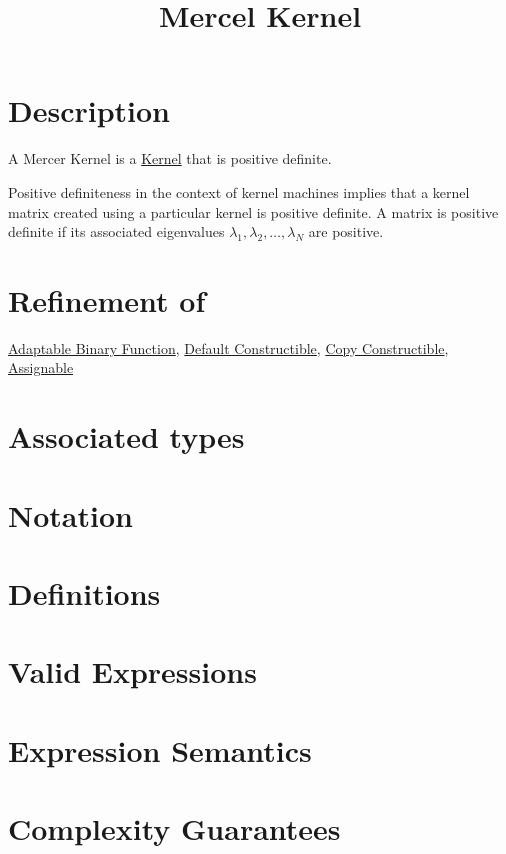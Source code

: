 \documentclass{article}
\begin{document}
\title{Mercel Kernel}
\maketitle

\section*{Description}

A Mercer Kernel is a \href{research/kml/documentation/kernel.html}{Kernel} that is positive definite.

Positive definiteness in the context of kernel machines implies that a kernel matrix created using 
a particular kernel is positive definite. A matrix is positive definite if its associated eigenvalues
$\lambda_1,\lambda_2,\ldots,\lambda_N$ are positive.


\section*{Refinement of}

\href{http://www.sgi.com/tech/stl/AdaptableBinaryFunction.html}{Adaptable Binary Function}, 
\href{http://www.sgi.com/tech/stl/DefaultConstructible.html}{Default Constructible}, 
\href{http://www.boost.org/doc/html/CopyConstructible.html}{Copy Constructible},
\href{http://www.sgi.com/tech/stl/Assignable.html}{Assignable}

\section*{Associated types}

\section*{Notation}
\section*{Definitions}
\section*{Valid Expressions}
\section*{Expression Semantics}

\section*{Complexity Guarantees}
\end{document}
